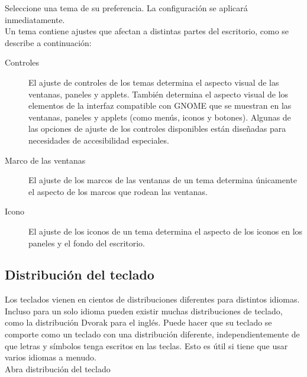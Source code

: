 \documentclass[12pt,letterpaper]{book}
\begin{document}
\begin{itemize}
Seleccione una tema de su preferencia. La configuración se aplicará inmediatamente.\\
Un tema contiene ajustes que afectan a distintas partes del escritorio, como se describe
a continuación:
\begin{description}
\item[Controles] El ajuste de controles de los temas determina el aspecto visual de las ventanas, paneles y applets. También determina el aspecto visual de los elementos de la interfaz compatible con GNOME que se muestran en las ventanas, paneles y applets (como menús, iconos y botones). Algunas de las opciones de ajuste de los controles disponibles están diseñadas para necesidades de accesibilidad especiales.
\item[Marco de las ventanas] El ajuste de los marcos de las ventanas de un tema determina únicamente el aspecto de los marcos que rodean las ventanas.
\item[Icono] El ajuste de los iconos de un tema determina el aspecto de los iconos en los paneles y el fondo del escritorio.
\end{description}
		\end{itemize}
	\subsection{Distribución del teclado}
	Los teclados vienen en cientos de distribuciones diferentes para distintos idiomas. Incluso para un solo idioma pueden existir muchas distribuciones de teclado, como la distribución Dvorak para el inglés. Puede hacer que su teclado se comporte como un teclado con una distribución diferente, independientemente de que letras y símbolos tenga escritos en las teclas. Esto es útil si tiene que usar varios idiomas a menudo.\\

Abra distribución del teclado\\
\end{document}
